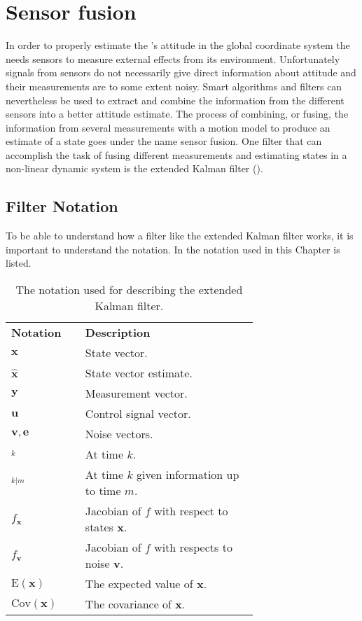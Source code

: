 \chapter{Sensor fusion}\label{cha:sensor_fusion}
In order to properly estimate the \abbrROV's attitude in the global coordinate system the \abbrROV needs sensors to measure external effects from its environment.
Unfortunately signals from sensors do not necessarily give direct information about attitude and their measurements are to some extent noisy. Smart algorithms and filters can nevertheless be used to extract and combine the information from the different sensors into a better attitude estimate. The process of combining, or fusing, the information from several measurements with a motion model to produce an estimate of a state goes under the name sensor fusion. One filter that can accomplish the task of fusing different measurements and estimating states in a non-linear dynamic system is the extended Kalman filter (\abbrEKF). 
\section{Filter Notation}
To be able to understand how a filter like the extended Kalman filter works, it is important to understand the notation. In   the notation used in this Chapter is listed.
 \begin{table}[htbp]
  \centering
  \caption{\label{tab:notationKalman}%
    The notation used for describing the extended Kalman filter.}
    \begin{tabular}{l p{0.7\linewidth}}
    \toprule%
    \textbf{Notation} & \textbf{Description} \\
    \otoprule%
    $\boldsymbol{x}$ & State vector.\\
    $\hat{\boldsymbol{x}}$ & State vector estimate.\\
    $\boldsymbol{y}$ & Measurement vector.\\
    $\boldsymbol{u}$ & Control signal vector.\\
    $\boldsymbol{v},\boldsymbol{e}$ & Noise vectors.\\
    $_k$ & At time $k$.\\
    $_{k|m}$ & At time $k$ given information up to time $m$.\\
    $f_{\boldsymbol{x}}$ & Jacobian of $f$ with respect to states $\boldsymbol{x}$.\\
    $f_{\boldsymbol{v}}$ & Jacobian of $f$ with respects to noise $\boldsymbol{v}$.\\
    $\text{E}(\boldsymbol{x})$ & The expected value of $\boldsymbol{x}$.\\
    $\text{Cov}(\boldsymbol{x})$ & The covariance of $\boldsymbol{x}$.\\
    \bottomrule%
 \end{tabular}
\end{table}

